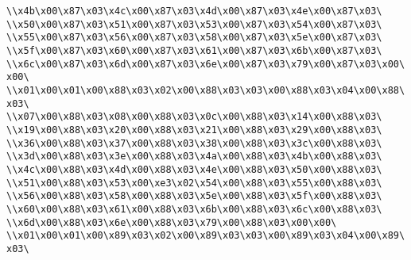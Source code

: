 \verb|\\x4b\x00\x87\x03\x4c\x00\x87\x03\x4d\x00\x87\x03\x4e\x00\x87\x03\|\newline
\verb|\\x50\x00\x87\x03\x51\x00\x87\x03\x53\x00\x87\x03\x54\x00\x87\x03\|\newline
\verb|\\x55\x00\x87\x03\x56\x00\x87\x03\x58\x00\x87\x03\x5e\x00\x87\x03\|\newline
\verb|\\x5f\x00\x87\x03\x60\x00\x87\x03\x61\x00\x87\x03\x6b\x00\x87\x03\|\newline
\verb|\\x6c\x00\x87\x03\x6d\x00\x87\x03\x6e\x00\x87\x03\x79\x00\x87\x03\x00\x00\|\newline
\verb|\\x01\x00\x01\x00\x88\x03\x02\x00\x88\x03\x03\x00\x88\x03\x04\x00\x88\x03\|\newline
\verb|\\x07\x00\x88\x03\x08\x00\x88\x03\x0c\x00\x88\x03\x14\x00\x88\x03\|\newline
\verb|\\x19\x00\x88\x03\x20\x00\x88\x03\x21\x00\x88\x03\x29\x00\x88\x03\|\newline
\verb|\\x36\x00\x88\x03\x37\x00\x88\x03\x38\x00\x88\x03\x3c\x00\x88\x03\|\newline
\verb|\\x3d\x00\x88\x03\x3e\x00\x88\x03\x4a\x00\x88\x03\x4b\x00\x88\x03\|\newline
\verb|\\x4c\x00\x88\x03\x4d\x00\x88\x03\x4e\x00\x88\x03\x50\x00\x88\x03\|\newline
\verb|\\x51\x00\x88\x03\x53\x00\xe3\x02\x54\x00\x88\x03\x55\x00\x88\x03\|\newline
\verb|\\x56\x00\x88\x03\x58\x00\x88\x03\x5e\x00\x88\x03\x5f\x00\x88\x03\|\newline
\verb|\\x60\x00\x88\x03\x61\x00\x88\x03\x6b\x00\x88\x03\x6c\x00\x88\x03\|\newline
\verb|\\x6d\x00\x88\x03\x6e\x00\x88\x03\x79\x00\x88\x03\x00\x00\|\newline
\verb|\\x01\x00\x01\x00\x89\x03\x02\x00\x89\x03\x03\x00\x89\x03\x04\x00\x89\x03\|\newline
